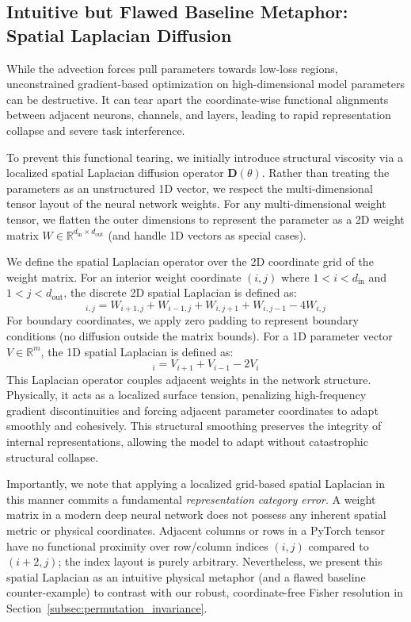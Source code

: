 \subsection{Intuitive but Flawed Baseline Metaphor: Spatial Laplacian Diffusion}
While the advection forces pull parameters towards low-loss regions, unconstrained gradient-based optimization on high-dimensional model parameters can be destructive. It can tear apart the coordinate-wise functional alignments between adjacent neurons, channels, and layers, leading to rapid representation collapse and severe task interference.

To prevent this functional tearing, we initially introduce structural viscosity via a localized spatial Laplacian diffusion operator $\mathbf{D}(\theta)$. Rather than treating the parameters as an unstructured 1D vector, we respect the multi-dimensional tensor layout of the neural network weights. For any multi-dimensional weight tensor, we flatten the outer dimensions to represent the parameter as a 2D weight matrix $W \in \mathbb{R}^{d_{\text{in}} \times d_{\text{out}}}$ (and handle 1D vectors as special cases).

We define the spatial Laplacian operator over the 2D coordinate grid of the weight matrix. For an interior weight coordinate $(i, j)$ where $1 < i < d_{\text{in}}$ and $1 < j < d_{\text{out}}$, the discrete 2D spatial Laplacian is defined as:
\begin{equation}
    [\mathbf{D}(W)]_{i,j} = W_{i+1,j} + W_{i-1,j} + W_{i,j+1} + W_{i,j-1} - 4W_{i,j}
\end{equation}
For boundary coordinates, we apply zero padding to represent boundary conditions (no diffusion outside the matrix bounds). For a 1D parameter vector $V \in \mathbb{R}^m$, the 1D spatial Laplacian is defined as:
\begin{equation}
    [\mathbf{D}(V)]_i = V_{i+1} + V_{i-1} - 2V_i
\end{equation}
This Laplacian operator couples adjacent weights in the network structure. Physically, it acts as a localized surface tension, penalizing high-frequency gradient discontinuities and forcing adjacent parameter coordinates to adapt smoothly and cohesively. This structural smoothing preserves the integrity of internal representations, allowing the model to adapt without catastrophic structural collapse.

Importantly, we note that applying a localized grid-based spatial Laplacian in this manner commits a fundamental \emph{representation category error}. A weight matrix in a modern deep neural network does not possess any inherent spatial metric or physical coordinates. Adjacent columns or rows in a PyTorch tensor have no functional proximity over row/column indices $(i, j)$ compared to $(i+2, j)$; the index layout is purely arbitrary. Nevertheless, we present this spatial Laplacian as an intuitive physical metaphor (and a flawed baseline counter-example) to contrast with our robust, coordinate-free Fisher resolution in Section~\ref{subsec:permutation_invariance}.

